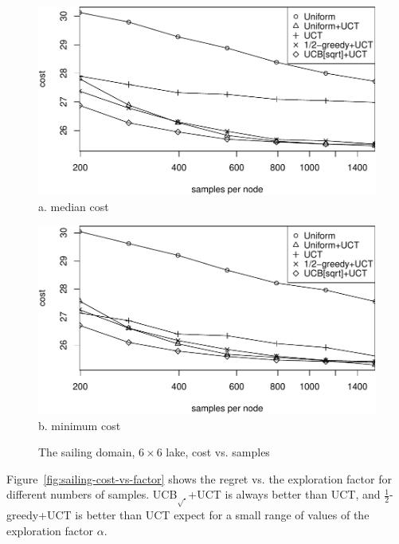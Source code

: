 \documentclass[letterpaper]{article}
\begin{document}
\begin{figure}[h!]
  \begin{minipage}[b]{1.0\linewidth}
    \centering
    \includegraphics[scale=0.425]{costs-size=6-group=median.pdf}\\
    a. median cost
    \vspace{0.5em}
  \end{minipage}
  \begin{minipage}[b]{1.0\linewidth}
    \centering
    \includegraphics[scale=0.425]{costs-size=6-group=minimum.pdf}\\
    b. minimum cost
  \end{minipage}
  \caption{The sailing domain, $6\times 6$ lake, cost vs. samples}
  \label{fig:sailing-cost-vs-nsamples}
\end{figure}

Figure~\ref{fig:sailing-cost-vs-factor} shows the regret vs. the
exploration factor for different numbers of samples. UCB$_{\sqrt{\cdot}}$+UCT is always better than
UCT, and $\frac 1 2$-greedy+UCT is better than UCT expect for a small range of
values of the exploration factor $\alpha$. 
\end{document}
